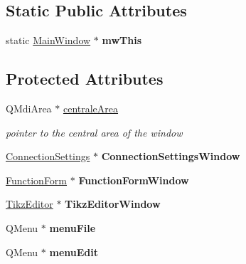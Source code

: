 \subsection*{Static Public Attributes}
\begin{DoxyCompactItemize}
\item 
\hypertarget{classMainWindow_a3e20293fd9bb07ee5c220ac0b3b5991e}{static \hyperlink{classMainWindow}{Main\+Window} $\ast$ {\bfseries mw\+This}}\label{classMainWindow_a3e20293fd9bb07ee5c220ac0b3b5991e}

\end{DoxyCompactItemize}
\subsection*{Protected Attributes}
\begin{DoxyCompactItemize}
\item 
\hypertarget{classMainWindow_af5df9378db57a148236d639dd928d08f}{Q\+Mdi\+Area $\ast$ \hyperlink{classMainWindow_af5df9378db57a148236d639dd928d08f}{centrale\+Area}}\label{classMainWindow_af5df9378db57a148236d639dd928d08f}

\begin{DoxyCompactList}\small\item\em pointer to the central area of the window \end{DoxyCompactList}\item 
\hypertarget{classMainWindow_ab2049e45c3b990813bfba9e385cfa93a}{\hyperlink{classConnectionSettings}{Connection\+Settings} $\ast$ {\bfseries Connection\+Settings\+Window}}\label{classMainWindow_ab2049e45c3b990813bfba9e385cfa93a}

\item 
\hypertarget{classMainWindow_a79dcb4ded5b6e74882366b30132446ee}{\hyperlink{classFunctionForm}{Function\+Form} $\ast$ {\bfseries Function\+Form\+Window}}\label{classMainWindow_a79dcb4ded5b6e74882366b30132446ee}

\item 
\hypertarget{classMainWindow_a489592ba062ec5f7eafb408fdc184322}{\hyperlink{classTikzEditor}{Tikz\+Editor} $\ast$ {\bfseries Tikz\+Editor\+Window}}\label{classMainWindow_a489592ba062ec5f7eafb408fdc184322}

\item 
\hypertarget{classMainWindow_a2ca04227e7d71b036ccd0ed4176a5561}{Q\+Menu $\ast$ {\bfseries menu\+File}}\label{classMainWindow_a2ca04227e7d71b036ccd0ed4176a5561}

\item 
\hypertarget{classMainWindow_a51ec7fcfcb60073b395dee46daacf1f9}{Q\+Menu $\ast$ {\bfseries menu\+Edit}}\label{classMainWindow_a51ec7fcfcb60073b395dee46daacf1f9}


\end{DoxyCompactItemize}
